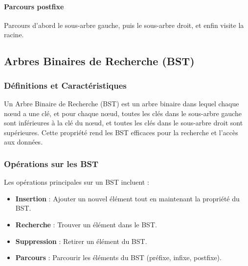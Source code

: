 \paragraph{Parcours postfixe}
Parcours d'abord le sous-arbre gauche, puis le sous-arbre droit, et enfin visite la racine.
\newline
{}

\subsection{Arbres Binaires de Recherche (BST)}\label{subsec:arbres-binaires-de-recherche-(bst)}

\subsubsection{Définitions et Caractéristiques}
Un Arbre Binaire de Recherche (BST) est un arbre binaire dans lequel chaque nœud a une clé, et pour chaque nœud, toutes les clés dans le sous-arbre gauche sont inférieures à la clé du nœud, et toutes les clés dans le sous-arbre droit sont supérieures.
Cette propriété rend les BST efficaces pour la recherche et l'accès aux données.

\subsubsection{Opérations sur les BST}
Les opérations principales sur un BST incluent :
\begin{itemize}
    \item \textbf{Insertion} : Ajouter un nouvel élément tout en maintenant la propriété du BST.
    \item \textbf{Recherche} : Trouver un élément dans le BST.
    \item \textbf{Suppression} : Retirer un élément du BST.
    \item \textbf{Parcours} : Parcourir les éléments du BST (préfixe, infixe, postfixe).
\end{itemize}

